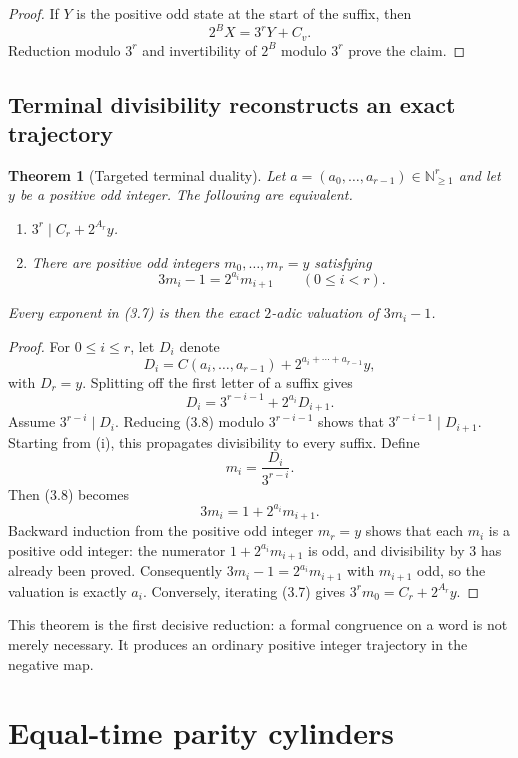 \documentclass[11pt]{article}
\newtheorem{theorem}{Theorem}[section]
\theoremstyle{definition}
\theoremstyle{remark}
\newcommand{\N}{\mathbb N}
\begin{document}
\begin{proof}
If $Y$ is the positive odd state at the start of the suffix, then
\[
 2^B X=3^rY+C_v.
\]
Reduction modulo $3^r$ and invertibility of $2^B$ modulo $3^r$ prove the
claim.
\end{proof}

\subsection{Terminal divisibility reconstructs an exact trajectory}

\begin{theorem}[Targeted terminal duality]\label{thm:duality}
Let $a=(a_0,\ldots,a_{r-1})\in\N_{\ge1}^r$ and let $y$ be a positive odd
integer.  The following are equivalent.
\begin{enumerate}[label=\textup{(\roman*)}]
\item $3^r\mid C_r+2^{A_r}y$.
\item There are positive odd integers $m_0,\ldots,m_r=y$ satisfying
\[
 3m_i-1=2^{a_i}m_{i+1}\qquad(0\le i<r).              \tag{3.7}
\]
\end{enumerate}
Every exponent in \textup{(3.7)} is then the exact $2$-adic valuation of
$3m_i-1$.
\end{theorem}

\begin{proof}
For $0\le i\le r$, let $D_i$ denote
\[
 D_i=C(a_i,\ldots,a_{r-1})
      +2^{a_i+\cdots+a_{r-1}}y,
\]
with $D_r=y$.  Splitting off the first letter of a suffix gives
\[
 D_i=3^{r-i-1}+2^{a_i}D_{i+1}.                       \tag{3.8}
\]
Assume $3^{r-i}\mid D_i$.  Reducing \textup{(3.8)} modulo
$3^{r-i-1}$ shows that $3^{r-i-1}\mid D_{i+1}$.  Starting from (i), this
propagates divisibility to every suffix.  Define
\[
 m_i=\frac{D_i}{3^{r-i}}.
\]
Then \textup{(3.8)} becomes
\[
 3m_i=1+2^{a_i}m_{i+1}.
\]
Backward induction from the positive odd integer $m_r=y$ shows that each
$m_i$ is a positive odd integer: the numerator $1+2^{a_i}m_{i+1}$ is odd,
and divisibility by $3$ has already been proved.  Consequently
$3m_i-1=2^{a_i}m_{i+1}$ with $m_{i+1}$ odd, so the valuation is exactly
$a_i$.  Conversely, iterating \textup{(3.7)} gives
$3^rm_0=C_r+2^{A_r}y$.
\end{proof}

This theorem is the first decisive reduction: a formal congruence on a word
is not merely necessary.  It produces an ordinary positive integer
trajectory in the negative map.

\section{Equal-time parity cylinders}\label{sec:equaltime}
\end{document}
